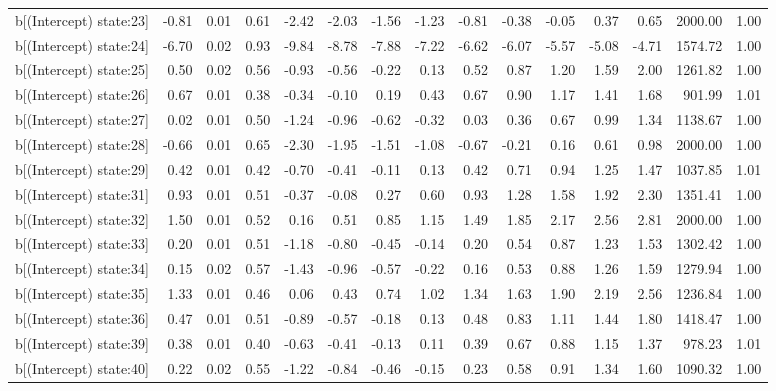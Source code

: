 \begin{table}[ht]
\begin{tabular}{rrrrrrrrrrrrrrr}
  b[(Intercept) state:23] & -0.81 & 0.01 & 0.61 & -2.42 & -2.03 & -1.56 & -1.23 & -0.81 & -0.38 & -0.05 & 0.37 & 0.65 & 2000.00 & 1.00 \\ 
  b[(Intercept) state:24] & -6.70 & 0.02 & 0.93 & -9.84 & -8.78 & -7.88 & -7.22 & -6.62 & -6.07 & -5.57 & -5.08 & -4.71 & 1574.72 & 1.00 \\ 
  b[(Intercept) state:25] & 0.50 & 0.02 & 0.56 & -0.93 & -0.56 & -0.22 & 0.13 & 0.52 & 0.87 & 1.20 & 1.59 & 2.00 & 1261.82 & 1.00 \\ 
  b[(Intercept) state:26] & 0.67 & 0.01 & 0.38 & -0.34 & -0.10 & 0.19 & 0.43 & 0.67 & 0.90 & 1.17 & 1.41 & 1.68 & 901.99 & 1.01 \\ 
  b[(Intercept) state:27] & 0.02 & 0.01 & 0.50 & -1.24 & -0.96 & -0.62 & -0.32 & 0.03 & 0.36 & 0.67 & 0.99 & 1.34 & 1138.67 & 1.00 \\ 
  b[(Intercept) state:28] & -0.66 & 0.01 & 0.65 & -2.30 & -1.95 & -1.51 & -1.08 & -0.67 & -0.21 & 0.16 & 0.61 & 0.98 & 2000.00 & 1.00 \\ 
  b[(Intercept) state:29] & 0.42 & 0.01 & 0.42 & -0.70 & -0.41 & -0.11 & 0.13 & 0.42 & 0.71 & 0.94 & 1.25 & 1.47 & 1037.85 & 1.01 \\ 
  b[(Intercept) state:31] & 0.93 & 0.01 & 0.51 & -0.37 & -0.08 & 0.27 & 0.60 & 0.93 & 1.28 & 1.58 & 1.92 & 2.30 & 1351.41 & 1.00 \\ 
  b[(Intercept) state:32] & 1.50 & 0.01 & 0.52 & 0.16 & 0.51 & 0.85 & 1.15 & 1.49 & 1.85 & 2.17 & 2.56 & 2.81 & 2000.00 & 1.00 \\ 
  b[(Intercept) state:33] & 0.20 & 0.01 & 0.51 & -1.18 & -0.80 & -0.45 & -0.14 & 0.20 & 0.54 & 0.87 & 1.23 & 1.53 & 1302.42 & 1.00 \\ 
  b[(Intercept) state:34] & 0.15 & 0.02 & 0.57 & -1.43 & -0.96 & -0.57 & -0.22 & 0.16 & 0.53 & 0.88 & 1.26 & 1.59 & 1279.94 & 1.00 \\ 
  b[(Intercept) state:35] & 1.33 & 0.01 & 0.46 & 0.06 & 0.43 & 0.74 & 1.02 & 1.34 & 1.63 & 1.90 & 2.19 & 2.56 & 1236.84 & 1.00 \\ 
  b[(Intercept) state:36] & 0.47 & 0.01 & 0.51 & -0.89 & -0.57 & -0.18 & 0.13 & 0.48 & 0.83 & 1.11 & 1.44 & 1.80 & 1418.47 & 1.00 \\ 
  b[(Intercept) state:39] & 0.38 & 0.01 & 0.40 & -0.63 & -0.41 & -0.13 & 0.11 & 0.39 & 0.67 & 0.88 & 1.15 & 1.37 & 978.23 & 1.01 \\ 
  b[(Intercept) state:40] & 0.22 & 0.02 & 0.55 & -1.22 & -0.84 & -0.46 & -0.15 & 0.23 & 0.58 & 0.91 & 1.34 & 1.60 & 1090.32 & 1.00 \\ 

\end{tabular}
\end{table}
